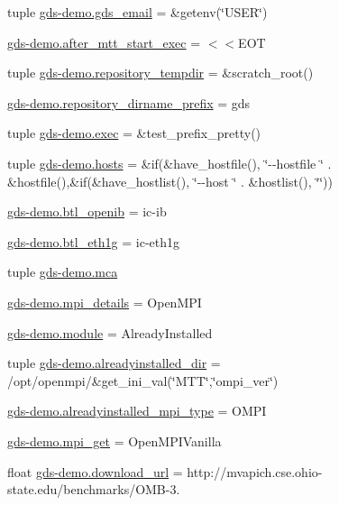 \begin{DoxyCompactItemize}
\item 
tuple \hyperlink{namespacegds-demo_a46212fa747c3d30872b524a4c5c62084}{gds-\/demo.\-gds\-\_\-email} = \&getenv(\char`\"{}U\-S\-E\-R\char`\"{})
\item 
\hyperlink{namespacegds-demo_a843952a47656e27f99b11351112482cc}{gds-\/demo.\-after\-\_\-mtt\-\_\-start\-\_\-exec} = $<$$<$E\-O\-T
\item 
tuple \hyperlink{namespacegds-demo_a963db84d8e885972e94d04061614763f}{gds-\/demo.\-repository\-\_\-tempdir} = \&scratch\-\_\-root()
\item 
\hyperlink{namespacegds-demo_a2840f90f55bf220489772c7ec78979da}{gds-\/demo.\-repository\-\_\-dirname\-\_\-prefix} = gds
\item 
tuple \hyperlink{namespacegds-demo_a860b0b1622e13aba647a797f1e3335cb}{gds-\/demo.\-exec} = \&test\-\_\-prefix\-\_\-pretty()
\item 
tuple \hyperlink{namespacegds-demo_a5d35655c0d94700bdf5cd1c850d5629f}{gds-\/demo.\-hosts} = \&if(\&have\-\_\-hostfile(), \char`\"{}-\/-\/hostfile \char`\"{} . \&hostfile(),\&if(\&have\-\_\-hostlist(), \char`\"{}-\/-\/host \char`\"{} . \&hostlist(), \char`\"{}\char`\"{}))
\item 
\hyperlink{namespacegds-demo_aeadba89193ad7b62e80b8c3a321f46d2}{gds-\/demo.\-btl\-\_\-openib} = ic-\/ib
\item 
\hyperlink{namespacegds-demo_a1a98caf64f4d8ec3980fda04116bb978}{gds-\/demo.\-btl\-\_\-eth1g} = ic-\/eth1g
\item 
tuple \hyperlink{namespacegds-demo_ae28af619e6658a48dc7674284fbde2e0}{gds-\/demo.\-mca}
\item 
\hyperlink{namespacegds-demo_a9dc2cdce477d3c17556857b0fd695d01}{gds-\/demo.\-mpi\-\_\-details} = Open\-M\-P\-I
\item 
\hyperlink{namespacegds-demo_afb50f91266d15d79ce91d59cd80b8369}{gds-\/demo.\-module} = Already\-Installed
\item 
tuple \hyperlink{namespacegds-demo_a7d7eb3eb651697eb48935ef101d672b3}{gds-\/demo.\-alreadyinstalled\-\_\-dir} = /opt/openmpi/\&get\-\_\-ini\-\_\-val(\char`\"{}M\-T\-T\char`\"{},\char`\"{}ompi\-\_\-ver\char`\"{})
\item 
\hyperlink{namespacegds-demo_a7446952915af641c8b9627f3e310e818}{gds-\/demo.\-alreadyinstalled\-\_\-mpi\-\_\-type} = O\-M\-P\-I
\item 
\hyperlink{namespacegds-demo_ae15a0b4fe34cdb90324a9fccefa74d54}{gds-\/demo.\-mpi\-\_\-get} = Open\-M\-P\-I\-Vanilla
\item 
float \hyperlink{namespacegds-demo_a36280178b5a910db19b6220529c58159}{gds-\/demo.\-download\-\_\-url} = http\-://mvapich.\-cse.\-ohio-\/state.\-edu/benchmarks/O\-M\-B-\/3.
$$
\end{DoxyCompactItemize}
